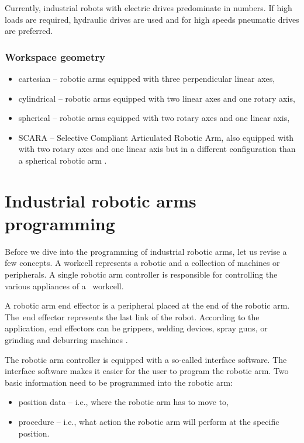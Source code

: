 Currently, industrial robots with electric drives predominate in numbers. If high loads are required, hydraulic drives are used and for high speeds pneumatic drives are preferred.

\subsubsection*{Workspace geometry}

\begin{itemize}
    \item cartesian -- robotic arms equipped with three perpendicular linear axes,
    \item cylindrical -- robotic arms equipped with two linear axes and one rotary axis,
    \item spherical --  robotic arms equipped with two rotary axes and one linear axis,
    \item SCARA -- Selective Compliant Articulated Robotic Arm, also equipped with with two rotary axes and one linear axis but in a different configuration than a spherical robotic arm \cite{vsb_2007}.
\end{itemize}

\section{Industrial robotic arms programming}

Before we dive into the programming of industrial robotic arms, let us revise a few concepts.
A workcell represents a robotic and a collection of machines or peripherals. A single robotic arm controller is responsible for controlling the various appliances of a~ workcell.

A robotic arm end effector is a peripheral placed at the end of the robotic arm. The~end effector represents the last link of the robot. According to the application, end effectors can be grippers, welding devices, spray guns, or grinding and deburring machines \cite{monkman_2007}.

The robotic arm controller is equipped with a so-called interface software. The interface software makes it easier for the user to program the robotic arm. Two basic information need to be programmed into the robotic arm:

\begin{itemize}
    \item position data -- i.e., where the robotic arm has to move to,
    \item procedure -- i.e., what action the robotic arm will perform at the specific position.
\end{itemize}


